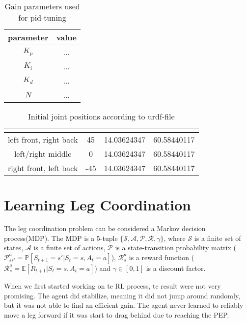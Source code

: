 \begin{table}[h]
	\centering
	\begin{tabular}{| c | c |}
		\hline
		parameter & value\\
		\hline
		$K_p$ & ... \\
		\hline
		$K_i$ & ... \\
		\hline
		$K_d$ & ... \\
		\hline
		$N$ & ... \\
		\hline
	\end{tabular}
	\caption{Gain parameters used for pid-tuning}
	\label{table: PID parameters}
\end{table}

\begin{table}
	\centering
	\begin{tabular}{| c | c | c | c |} 
		\hline
		 & \textbf{\textalpha} & \textbf{\textbeta} & \textbf{\textgamma} \\ [0.5ex] 
		\hline
		left front, right back & 45 & 14.03624347 & 60.58440117  \\ 
		\hline
		left/right middle & 0 & 14.03624347 & 60.58440117 \\
		\hline
		right front, left back & -45 & 14.03624347 & 60.58440117 \\
		\hline
	\end{tabular}
	\caption{Initial joint positions according to urdf-file}
	\label{table:Initial joint positions}
\end{table}



\section{Learning Leg Coordination}
The leg coordination problem can be considered a Markov decision process(MDP).
The MDP is a 5-tuple $\mathcal{\{S,A,P,R,\gamma\}}$, where $\mathcal{S}$ is a finite set of states, $\mathcal{A}$ is a finite set of actions, $\mathcal{P}$ is a state-transition probability matrix ($\mathcal{P}_{ss'}^a=\mathbb{P}[S_{t+1}=s' | S_t=s, A_t=a]$), $\mathcal{R}_s^a$ is a reward function ($\mathcal{R}_s^a = \mathbb{E}[R_{t+1} | S_t=s, A_t=a]$) and $\gamma \in [0,1]$ is a discount factor.



When we first started working on te RL process, te result were not very promising. The agent did stabilize, meaning it did not jump around randomly, but it was not able to find an efficient gain.
The agent never learned to reliably move a leg forward if it was start to drag behind due to reaching the PEP.

